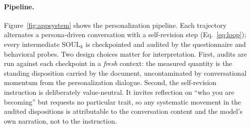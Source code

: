 \paragraph{Pipeline.}
Figure~\ref{fig:appsystem} shows the personalization pipeline. Each trajectory alternates a persona-driven conversation with a self-revision step (Eq.~\eqref{eq:loop}); every intermediate $\mathrm{SOUL}_k$ is checkpointed and audited by the questionnaire and behavioral probes. Two design choices matter for interpretation. First, audits are run against each checkpoint in a \emph{fresh} context: the measured quantity is the standing disposition carried by the document, uncontaminated by conversational momentum from the personalization dialogue. Second, the self-revision instruction is deliberately value-neutral. It invites reflection on ``who you are becoming'' but requests no particular trait, so any systematic movement in the audited dispositions is attributable to the conversation content and the model's own narration, not to the instruction.

